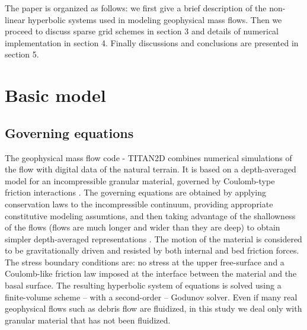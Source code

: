 \documentclass{article}
\begin{document}
The paper is organized as follows: we first give a brief description of the non-linear hyperbolic systems
used in modeling geophysical mass flows. Then we proceed to discuss sparse grid schemes 
in section 3 and details of numerical implementation in section 4. Finally discussions and conclusions
are presented in section 5.

\section{Basic model}
\subsection{Governing equations}
The geophysical mass flow code - TITAN2D combines numerical simulations of the flow with
digital data of the natural terrain. It is based on a depth-averaged
model for an incompressible granular material, governed by
Coulomb-type friction interactions \citep{Savage1989}.  The
governing equations are obtained by applying conservation laws to the
incompressible continuum, providing appropriate constitutive modeling
assumtions, and then taking advantage of the shallowness of the flows
(flows are much longer and wider than they are deep) to obtain simpler
depth-averaged representations \citep{Patra2005}. The motion of the
material is considered to be gravitationally driven and resisted by
both internal and bed friction forces. The stress boundary conditions
are: no stress at the upper free-surface and a Coulomb-like friction law
imposed at the interface between the material and the basal
surface. The resulting hyperbolic system of equations is solved using a
finite-volume scheme -- with a second-order -- Godunov solver. Even if many
real geophysical flows such as debris flow are fluidized, in this
study we deal only with granular material that has not been fluidized.
\end{document}
